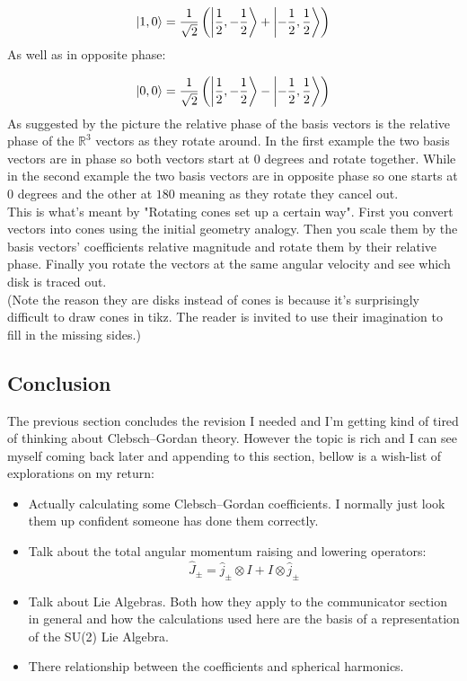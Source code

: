 \[\left|1,0\right\rangle=\frac{1}{\sqrt{2}}\left(\left|\frac{1}{2},-\frac{1}{2}\right\rangle+\left|-\frac{1}{2},\frac{1}{2}\right\rangle\right)\]
As well as in opposite phase:
\begin{center}
\end{center}
\[\left|0,0\right\rangle=\frac{1}{\sqrt{2}}\left(\left|\frac{1}{2},-\frac{1}{2}\right\rangle-\left|-\frac{1}{2},\frac{1}{2}\right\rangle\right)\]
As suggested by the picture the relative phase of the basis vectors is the relative phase of the $\mathbb{R}^3$ vectors as they rotate around.
In the first example the two basis vectors are in phase so both vectors start at $0$ degrees and rotate together.
While in the second example the two basis vectors are in opposite phase so one starts at $0$ degrees and the other at $180$ meaning as they rotate they cancel out.
\\

This is what's meant by "Rotating cones set up a certain way".
First you convert vectors into cones using the initial geometry analogy.
Then you scale them by the basis vectors' coefficients relative magnitude and rotate them by their relative phase.
Finally you rotate the vectors at the same angular velocity and see which disk is traced out.
\\

(Note the reason they are disks instead of cones is because it's surprisingly difficult to draw cones in tikz.
The reader is invited to use their imagination to fill in the missing sides.)

\subsection{Conclusion}
The previous section concludes the revision I needed and I'm getting kind of tired of thinking about Clebsch–Gordan theory.
However the topic is rich and I can see myself coming back later and appending to this section,
bellow is a wish-list of explorations on my return:
\begin{itemize}
	\item Actually calculating some Clebsch–Gordan coefficients.
		I normally just look them up confident someone has done them correctly.
	\item Talk about the total angular momentum raising and lowering operators:
		\[\hat{J}_\pm = \hat{j}_\pm\otimes I + I\otimes\hat{j}_\pm\]
	\item Talk about Lie Algebras.
		Both how they apply to the communicator section in general and how the calculations used here are the basis of a representation of the SU(2) Lie Algebra.
	\item There relationship between the coefficients and spherical harmonics.
\end{itemize}
